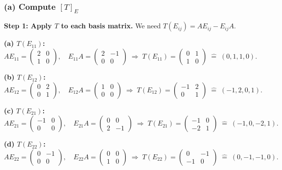 \documentclass[a4paper,12pt]{article}
\begin{document}
\subsubsection*{(a) Compute $[T]_E$}

\textbf{Step 1: Apply $T$ to each basis matrix.} We need $T(E_{ij}) = A E_{ij} - E_{ij} A$.

\textbf{(a) $T(E_{11})$:}
\[
A E_{11} = \begin{pmatrix} 2 & 0 \\ 1 & 0 \end{pmatrix},\quad
E_{11} A = \begin{pmatrix} 2 & -1 \\ 0 & 0 \end{pmatrix}
\;\Rightarrow\;
T(E_{11}) = \begin{pmatrix} 0 & 1 \\ 1 & 0 \end{pmatrix}
\;\widehat{=}\; (0, 1, 1, 0).
\]

\textbf{(b) $T(E_{12})$:}
\[
A E_{12} = \begin{pmatrix} 0 & 2 \\ 0 & 1 \end{pmatrix},\quad
E_{12} A = \begin{pmatrix} 1 & 0 \\ 0 & 0 \end{pmatrix}
\;\Rightarrow\;
T(E_{12}) = \begin{pmatrix} -1 & 2 \\ 0 & 1 \end{pmatrix}
\;\widehat{=}\; (-1, 2, 0, 1).
\]

\textbf{(c) $T(E_{21})$:}
\[
A E_{21} = \begin{pmatrix} -1 & 0 \\ 0 & 0 \end{pmatrix},\quad
E_{21} A = \begin{pmatrix} 0 & 0 \\ 2 & -1 \end{pmatrix}
\;\Rightarrow\;
T(E_{21}) = \begin{pmatrix} -1 & 0 \\ -2 & 1 \end{pmatrix}
\;\widehat{=}\; (-1, 0, -2, 1).
\]

\textbf{(d) $T(E_{22})$:}
\[
A E_{22} = \begin{pmatrix} 0 & -1 \\ 0 & 0 \end{pmatrix},\quad
E_{22} A = \begin{pmatrix} 0 & 0 \\ 1 & 0 \end{pmatrix}
\;\Rightarrow\;
T(E_{22}) = \begin{pmatrix} 0 & -1 \\ -1 & 0 \end{pmatrix}
\;\widehat{=}\; (0, -1, -1, 0).
\]
\end{document}
